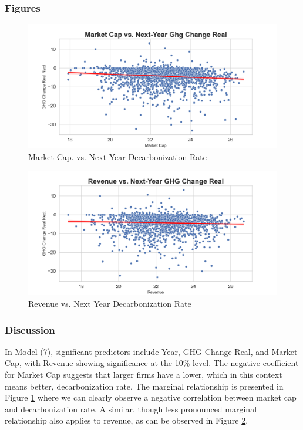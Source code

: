 



\subsubsection{Figures}
\begin{figure}[H]
\centering
  \includegraphics[width=\textwidth]{figures/market_cap_vs_ghg_change_real_next.png}
\caption{Market Cap. vs. Next Year Decarbonization Rate}
\label{fig:market_cap_vs_ghg_change_real_next}
\end{figure}

\begin{figure}[H]
\centering
  \includegraphics[width=\textwidth]{figures/revenue_vs_ghg_change_real_next.png}
\caption{Revenue vs. Next Year Decarbonization Rate}
\label{fig:revenue_vs_ghg_change_real_next}
\end{figure}

\subsubsection{Discussion}
In Model (7), significant predictors include Year, GHG Change Real, and Market Cap, with Revenue showing significance at the 10\% level. The negative coefficient for Market Cap suggests that larger firms have a lower, which in this context means better, decarbonization rate. The marginal relationship is presented in Figure \ref{fig:market_cap_vs_ghg_change_real_next} where we can clearly observe a negative correlation between market cap and decarbonization rate. A similar, though less pronounced marginal relationship also applies to revenue, as can be observed in Figure \ref{fig:revenue_vs_ghg_change_real_next}.
    

